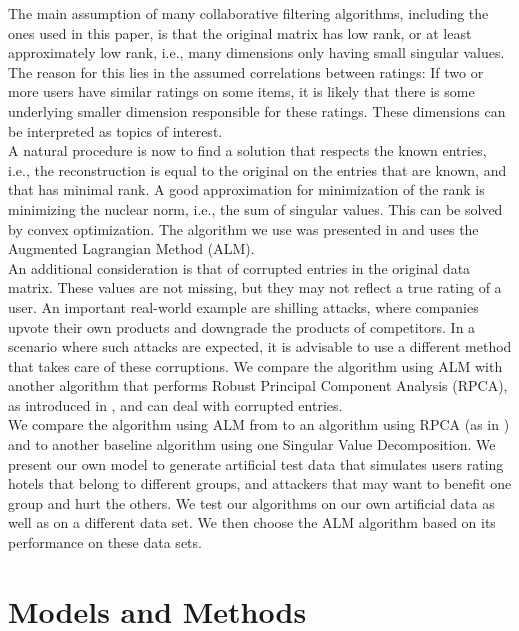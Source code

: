 \documentclass[10pt,conference,compsocconf]{IEEEtran}
\begin{document}
The main assumption of many collaborative filtering algorithms, including the ones used in this paper,
is that the original matrix has low rank, or at least approximately low rank, i.e., many dimensions
only having small singular values. The reason for this lies in the assumed correlations between ratings:
If two or more users have similar ratings on some items, it is likely that there is some underlying smaller
dimension responsible for these ratings. These dimensions can be interpreted as topics of interest. \\

A natural procedure is now to find a solution that respects the known entries, i.e., the reconstruction is equal 
to the original on the entries that are known, and that has minimal rank. A good approximation for minimization
of the rank is minimizing the nuclear norm, i.e., the sum of singular values. This can be solved by convex optimization. 
The algorithm we use was presented in \cite{almpaper} and uses the Augmented Lagrangian Method (ALM). \\

An additional consideration is that of corrupted entries in the original data matrix. These values are not missing,
but they may not reflect a true rating of a user. An important real-world example are shilling attacks, where companies
upvote their own products and downgrade the products of competitors. In a scenario where such attacks are expected, it
is advisable to use a different method that takes care of these corruptions. We compare the algorithm using ALM with another algorithm that performs Robust Principal Component Analysis (RPCA), as introduced in \cite{rpcapaper}, and can deal with corrupted entries. \\

We compare the algorithm using ALM from \cite{almpaper} to an algorithm using RPCA (as in \cite{rpcapaper}) and to another baseline algorithm using one Singular Value Decomposition. We present our own model to generate artificial test data that simulates users rating hotels that belong to different groups, and attackers that may want to benefit one group and hurt the others. We test our algorithms on our own artificial data as well as on a different data set. We then choose the ALM algorithm based on its performance on these data sets.

\section{Models and Methods}
\end{document}
